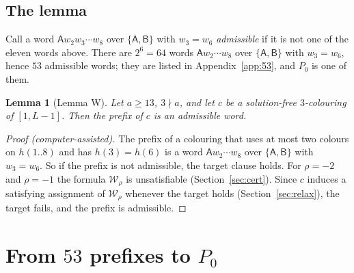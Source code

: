 \documentclass[11pt]{amsart}
\newtheorem{lemma}[theorem]{Lemma}
\theoremstyle{definition}
\theoremstyle{remark}
\newcommand{\cA}{\mathsf{A}}\newcommand{\cB}{\mathsf{B}}\newcommand{\cC}{\mathsf{C}}
\newcommand{\Pz}{P_0}
\begin{document}
\subsection{The lemma}
Call a word $\cA w_2w_3\cdots w_8$ over $\{\cA,\cB\}$ with $w_3=w_6$ \emph{admissible} if it is not one of the eleven
words above. There are $2^6=64$ words $\cA w_2\cdots w_8$ over $\{\cA,\cB\}$ with $w_3=w_6$, hence $53$ admissible
words; they are listed in Appendix~\ref{app:53}, and $\Pz$ is one of them.

\begin{lemma}[Lemma W]\label{lem:W}
Let $a\ge13$, $3\nmid a$, and let $c$ be a solution-free $3$-colouring of $[1,L-1]$. Then the prefix of $c$ is an
admissible word.
\end{lemma}
\begin{proof}[Proof (computer-assisted)]
The prefix of a colouring that uses at most two colours on $h(1..8)$ and has $h(3)=h(6)$ is a word
$\cA w_2\cdots w_8$ over $\{\cA,\cB\}$ with $w_3=w_6$. So if the prefix is not admissible, the target clause holds.
For $\rho=-2$ and $\rho=-1$ the formula $\mathcal W_\rho$ is unsatisfiable (Section~\ref{sec:cert}). Since $c$
induces a satisfying assignment of $\mathcal W_\rho$ whenever the target holds (Section~\ref{sec:relax}), the target
fails, and the prefix is admissible.
\end{proof}

\section{From $53$ prefixes to $\Pz$}\label{sec:53}
\end{document}
